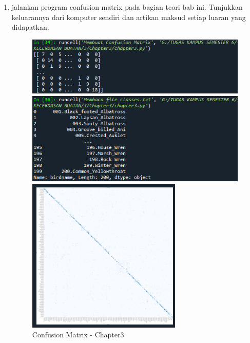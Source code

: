 \begin{enumerate}
    \item jalankan program confusion matrix pada bagian teori bab ini. Tunjukkan keluarannya dari komputer sendiri dan artikan maksud setiap luaran yang didapatkan.
          \begin{figure}[ht]
              \centerline{\includegraphics[scale=0.7]{figures/chapter3-5.png}}
              \centerline{\includegraphics[scale=0.7]{figures/chapter3-5a.png}}
              \centerline{\includegraphics[scale=1.3]{figures/chapter3-5b.png}}
              \caption{Confusion Matrix - Chapter3}
              \label{Confusion Matrix - Chapter3}
          \end{figure}
          \newpage


\end{enumerate}
